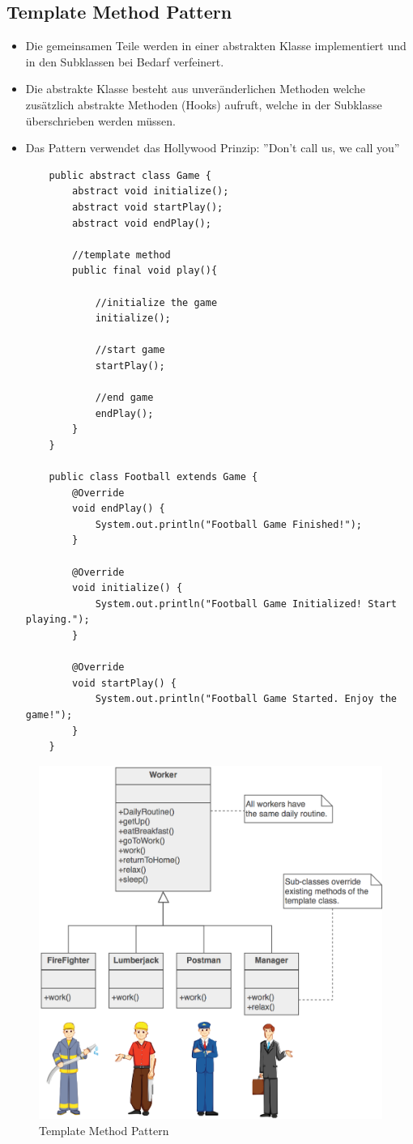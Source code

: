 \subsection{Template Method Pattern}
\begin{itemize}
	\item Die gemeinsamen Teile werden in einer abstrakten Klasse implementiert und in den Subklassen bei Bedarf verfeinert.
	\item Die abstrakte Klasse besteht aus unveränderlichen Methoden welche zusätzlich abstrakte Methoden (Hooks) aufruft, welche in der Subklasse überschrieben werden müssen.
	\item Das Pattern verwendet das Hollywood Prinzip: ''Don't call us, we call you''
	\begin{lstlisting}
	public abstract class Game {
		abstract void initialize();
		abstract void startPlay();
		abstract void endPlay();
		
		//template method
		public final void play(){
			
			//initialize the game
			initialize();
			
			//start game
			startPlay();
			
			//end game
			endPlay();
		}
	}
	
	public class Football extends Game {
		@Override
		void endPlay() {
			System.out.println("Football Game Finished!");
		}
		
		@Override
		void initialize() {
			System.out.println("Football Game Initialized! Start playing.");
		}
		
		@Override
		void startPlay() {
			System.out.println("Football Game Started. Enjoy the game!");
		}
	}
	\end{lstlisting}
\end{itemize}
\begin{figure}[h]
	\centering
	\includegraphics[width=0.6\linewidth]{images/template_methode_pattern}
	\caption{Template Method Pattern}
\end{figure}

